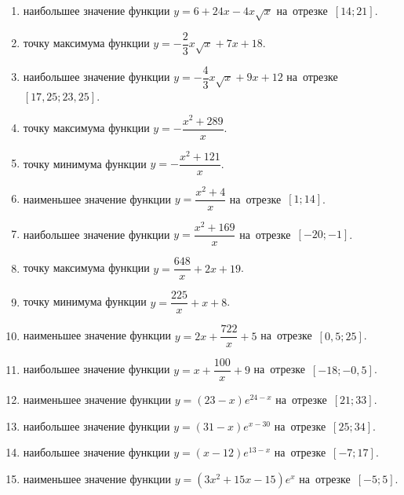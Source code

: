 \documentclass[a4paper,10pt]{article}
\begin{document}
\begin{enumerate}
\item {} наибольшее значение функции $y=6+24x -4x\sqrt{x}$ на~отрезке~$\left[14;21\right]$.

\item {} точку максимума функции $y=-\dfrac{2}{3}x\sqrt{x} +7x+18$.

\item {} наибольшее значение функции $y=-\dfrac{4}{3}x\sqrt{x} +9x+12$ на~отрезке~$\left[17,25;23,25\right]$.

\item {} точку максимума функции $y=-\dfrac{x^2 +289}{x}$.

\item {} точку минимума функции $y=-\dfrac{x^2 +121}{x}$.

\item {} наименьшее значение функции $y=\dfrac{x^2 +4}{x}$ на~отрезке~$\left[1;14\right]$.

\item {} наибольшее значение функции $y=\dfrac{x^2 +169}{x}$ на~отрезке~$\left[-20;-1\right]$.

\item {} точку максимума функции $y=\dfrac{648}{x} +2x+19$.

\item {} точку минимума функции $y=\dfrac{225}{x} +x+8$.

\item {} наименьшее значение функции $y=2x+\dfrac{722}{x} +5$ на~отрезке~$\left[0,5;25\right]$.

\item {} наибольшее значение функции $y=x+\dfrac{100}{x} +9$ на~отрезке~$\left[-18;-0,5\right]$.

\item {} наименьшее значение функции $y=\left(23-x\right)e^{24-x}$ на~отрезке~$\left[21;33\right]$.

\item {} наибольшее значение функции $y=\left(31-x\right)e^{x-30}$ на~отрезке~$\left[25;34\right]$.

\item {} наибольшее значение функции $y=\left(x-12\right)e^{13-x}$ на~отрезке~$\left[-7;17\right]$.

\item {} наименьшее значение функции $y=\left(3x^2 +15x -15\right)e^{x }$ на~отрезке~$\left[-5;5\right]$.


\end{enumerate}
\end{document}
